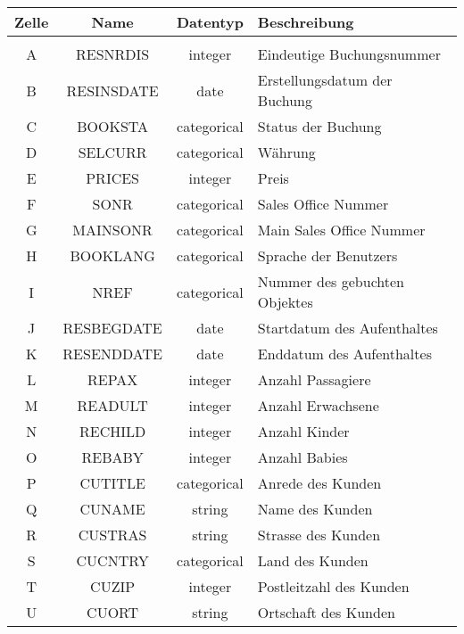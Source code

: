 \begin{longtable}{ | c | c | c | L{7.5cm} | } 
	\hline 
	\bfseries Zelle & \bfseries Name & \bfseries Datentyp & \bfseries Beschreibung \\ \hline 
	
	 \\ \hline
	A & RESNRDIS & integer & Eindeutige Buchungsnummer \\ \hline 
	B & RESINSDATE & date & Erstellungsdatum der Buchung \\ \hline 
	C & BOOKSTA & categorical & Status der Buchung \\ \hline 
	D & SELCURR & categorical & Währung \\ \hline 
	E & PRICES & integer & Preis \\ \hline 
	F & SONR & categorical & Sales Office Nummer \\ \hline 
	G & MAINSONR & categorical & Main Sales Office Nummer \\ \hline 
	H & BOOKLANG & categorical & Sprache der Benutzers \\ \hline 
	I & NREF & categorical & Nummer des gebuchten Objektes \\ \hline 
	J & RESBEGDATE & date & Startdatum des Aufenthaltes \\ \hline 
	K & RESENDDATE & date & Enddatum des Aufenthaltes \\ \hline 
	L & REPAX & integer & Anzahl Passagiere \\ \hline 
	M & READULT & integer & Anzahl Erwachsene \\ \hline 
	N & RECHILD & integer & Anzahl Kinder \\ \hline 
	O & REBABY & integer & Anzahl Babies \\ \hline 
	P & CUTITLE & categorical & Anrede des Kunden \\ \hline 
	Q & CUNAME & string & Name des Kunden \\ \hline 
	R & CUSTRAS & string & Strasse des Kunden \\ \hline 
	S & CUCNTRY & categorical & Land des Kunden \\ \hline 
	T & CUZIP & integer & Postleitzahl des Kunden \\ \hline 
	U & CUORT & string & Ortschaft des Kunden \\ \hline 
	

\end{longtable}
